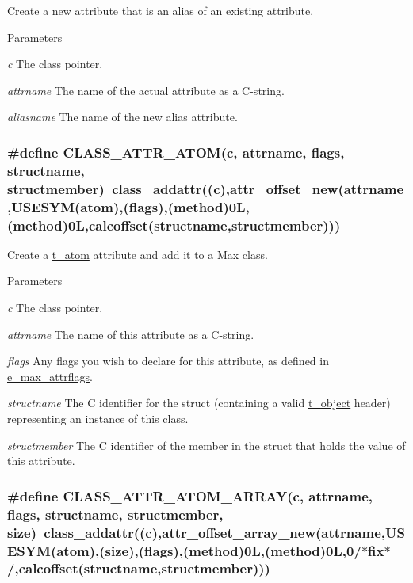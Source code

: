 Create a new attribute that is an alias of an existing attribute. 
\begin{DoxyParams}{Parameters}
\item[{\em c}]The class pointer. \item[{\em attrname}]The name of the actual attribute as a C-\/string. \item[{\em aliasname}]The name of the new alias attribute. \end{DoxyParams}
\hypertarget{group__attr_gabc5c0dc2b547fed7406250b08aaf3904}{
\subsubsection[{CLASS\_\-ATTR\_\-ATOM}]{\setlength{\rightskip}{0pt plus 5cm}\#define CLASS\_\-ATTR\_\-ATOM(c, \/  attrname, \/  flags, \/  structname, \/  structmember)~class\_\-addattr((c),attr\_\-offset\_\-new(attrname,USESYM(atom),(flags),({\bf method})0L,(method)0L,calcoffset(structname,structmember)))}}
\label{group__attr_gabc5c0dc2b547fed7406250b08aaf3904}


Create a \hyperlink{structt__atom}{t\_\-atom} attribute and add it to a Max class. 
\begin{DoxyParams}{Parameters}
\item[{\em c}]The class pointer. \item[{\em attrname}]The name of this attribute as a C-\/string. \item[{\em flags}]Any flags you wish to declare for this attribute, as defined in \hyperlink{group__attr_gaf296cfc6741bb19207f6ed8062809115}{e\_\-max\_\-attrflags}. \item[{\em structname}]The C identifier for the struct (containing a valid \hyperlink{structt__object}{t\_\-object} header) representing an instance of this class. \item[{\em structmember}]The C identifier of the member in the struct that holds the value of this attribute. \end{DoxyParams}
\hypertarget{group__attr_gae1107e588b0d087305bcff2ebb91310b}{
\subsubsection[{CLASS\_\-ATTR\_\-ATOM\_\-ARRAY}]{\setlength{\rightskip}{0pt plus 5cm}\#define CLASS\_\-ATTR\_\-ATOM\_\-ARRAY(c, \/  attrname, \/  flags, \/  structname, \/  structmember, \/  size)~class\_\-addattr((c),attr\_\-offset\_\-array\_\-new(attrname,USESYM(atom),(size),(flags),({\bf method})0L,(method)0L,0/$\ast$fix$\ast$/,calcoffset(structname,structmember)))}}
\label{group__attr_gae1107e588b0d087305bcff2ebb91310b}



